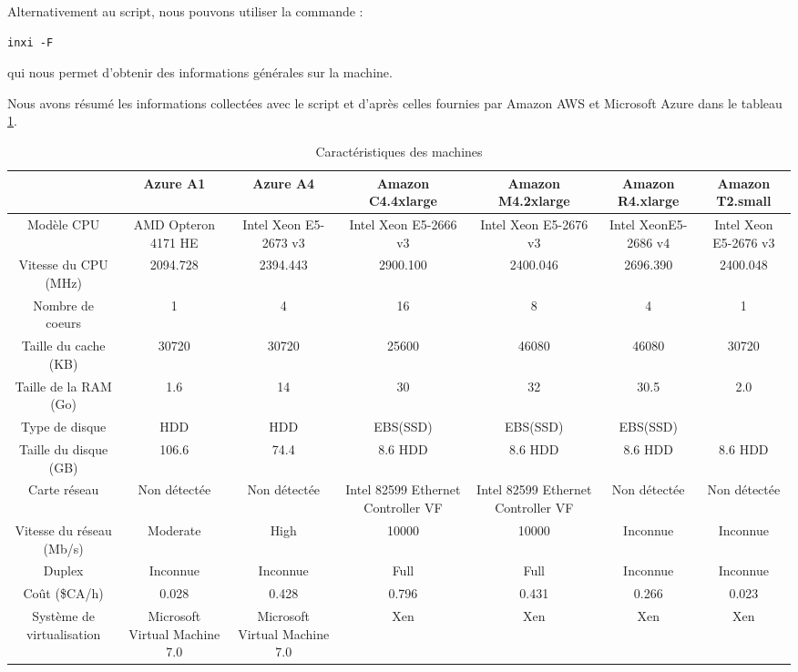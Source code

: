 Alternativement au script, nous pouvons utiliser la commande :
\begin{verbatim}
inxi -F
\end{verbatim}
qui nous permet d'obtenir des informations générales sur la machine. \newline

Nous avons résumé les informations collectées avec le script et d'après celles fournies par Amazon AWS et Microsoft Azure dans le tableau \ref{tab:machines_caract}.

\begin{table}[h]
  \caption{Caractéristiques des machines}
  \label{tab:machines_caract}
  \begin{center}
  \begin{adjustbox}{width=1.5\textwidth,center=\textwidth}
    \begin{tabular}{c||cc|cccc}
    & Azure A1 & Azure A4 & Amazon C4.4xlarge & Amazon M4.2xlarge & Amazon R4.xlarge & Amazon T2.small \\ \hline
	Modèle CPU & AMD Opteron 4171 HE & Intel Xeon E5-2673 v3 & Intel Xeon E5-2666 v3 & Intel Xeon E5-2676 v3 & Intel XeonE5-2686 v4 & Intel Xeon E5-2676 v3 \\
    Vitesse du CPU (MHz) & 2094.728 & 2394.443 & 2900.100 & 2400.046 & 2696.390 & 2400.048 \\
    Nombre de coeurs & 1 & 4 & 16 & 8 & 4 & 1 \\
    Taille du cache (KB) & 30720 & 30720 & 25600 & 46080 & 46080 & 30720 \\ \hline
    Taille de la RAM (Go) & 1.6 & 14 & 30 & 32 & 30.5 & 2.0 \\
    Type de disque & HDD & HDD & EBS(SSD)  & EBS(SSD) & EBS(SSD)\\ 
    Taille du disque (GB) & 106.6 & 74.4 & 8.6 HDD & 8.6 HDD & 8.6 HDD & 8.6 HDD \\  \hline
    Carte réseau & Non détectée & Non détectée & Intel 82599 Ethernet Controller VF & Intel 82599 Ethernet Controller VF & Non détectée & Non détectée \\
    Vitesse du réseau (Mb/s) & Moderate & High & 10000 & 10000 & Inconnue & Inconnue \\
    Duplex & Inconnue & Inconnue & Full & Full & Inconnue & Inconnue \\ \hline
    Coût (\$CA/h) & 0.028 & 0.428 & 0.796 & 0.431 & 0.266 & 0.023 \\ 
    Système de virtualisation & Microsoft Virtual Machine 7.0 & Microsoft Virtual Machine 7.0 & Xen & Xen & Xen & Xen \\
    \end{tabular}
    \end{adjustbox}
    \end{center}
\end{table}
